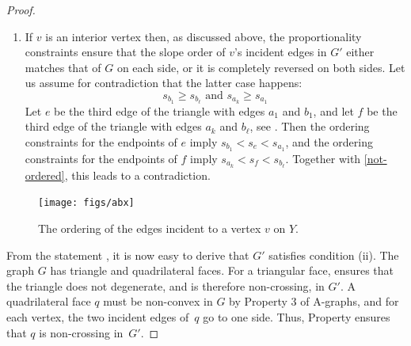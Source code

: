 \begin{proof}
\begin{enumerate}
\begin{enumerate}
\item If $v$ is an interior vertex then,
  as discussed above, the proportionality constraints ensure that the
  slope order of $v$'s incident edges in $G'$ either matches that of
  $G$ on each side, or it is completely reversed on both sides.
  Let us assume for contradiction that the latter case happens:
  \begin{equation}
    \label{eq:not-ordered}
    s_{b_1}\ge s_{b_\ell}
    \text{ and }
    s_{a_k}\ge s_{a_1}
  \end{equation}
  Let $e$ be the third edge of the triangle with edges $a_1$ and
  $b_1$, and let $f$ be the third edge of the triangle with edges
  $a_k$ and $b_\ell$, see .
			Then the ordering constraints for the endpoints of $e$ imply
			\begin{math}
			s_{b_1}<s_e<s_{a_1}
			\end{math},
			and the ordering constraints for the endpoints of $f$ imply
			\begin{math}
			s_{a_k}<s_f<s_{b_\ell}
			\end{math}.
			Together with \eqref{not-ordered}, this leads to a contradiction.
		\end{enumerate}
\end{enumerate}

\begin{figure}
  \centering
  {\texttt{[image: figs/abx]}}
  \caption{The ordering of the edges incident to a vertex $v$ on $Y$.}
\end{figure}


From the statement \thetag{$*$}, it is now easy to derive that
$G'$ satisfies condition (ii).
The graph $G$ has triangle and quadrilateral faces.
%
For a triangular face, \thetag{$*$} ensures that the triangle does not
degenerate, and is therefore non-crossing, in $G'$.
A quadrilateral face $q$ must be non-convex in $G$ by Property 3 of
A-graphs, and for each vertex, the two incident edges of~$q$ go to one
side. Thus, Property \thetag{$*$} ensures that $q$ is non-crossing in~$G'$.





\end{proof}
